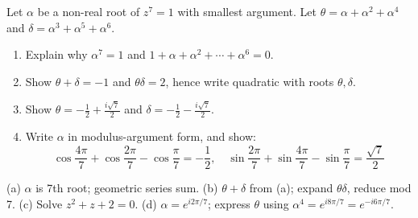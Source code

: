 \vspace{1cm}

\begin{problem}
Let $\alpha$ be a non-real root of $z^7 = 1$ with smallest argument.
Let $\theta = \alpha + \alpha^2 + \alpha^4$ and $\delta = \alpha^3 + \alpha^5 + \alpha^6$.
\begin{enumerate}
    \item Explain why $\alpha^7 = 1$ and $1 + \alpha + \alpha^2 + \cdots + \alpha^6 = 0$.
    \item Show $\theta + \delta = -1$ and $\theta\delta = 2$, hence write quadratic with roots $\theta, \delta$.
    \item Show $\theta = -\frac{1}{2} + \frac{i\sqrt{7}}{2}$ and $\delta = -\frac{1}{2} - \frac{i\sqrt{7}}{2}$.
    \item Write $\alpha$ in modulus-argument form, and show:
    $$\cos\frac{4\pi}{7} + \cos\frac{2\pi}{7} - \cos\frac{\pi}{7} = -\frac{1}{2}, \quad \sin\frac{2\pi}{7} + \sin\frac{4\pi}{7} - \sin\frac{\pi}{7} = \frac{\sqrt{7}}{2}$$
\end{enumerate}
\end{problem}

\vspace{0.5cm}
\begin{hintbox}
(a) $\alpha$ is 7th root; geometric series sum. (b) $\theta+\delta$ from (a); expand $\theta\delta$, reduce mod 7. (c) Solve $z^2+z+2=0$. (d) $\alpha=e^{i2\pi/7}$; express $\theta$ using $\alpha^4=e^{i8\pi/7}=e^{-i6\pi/7}$.
\end{hintbox}

